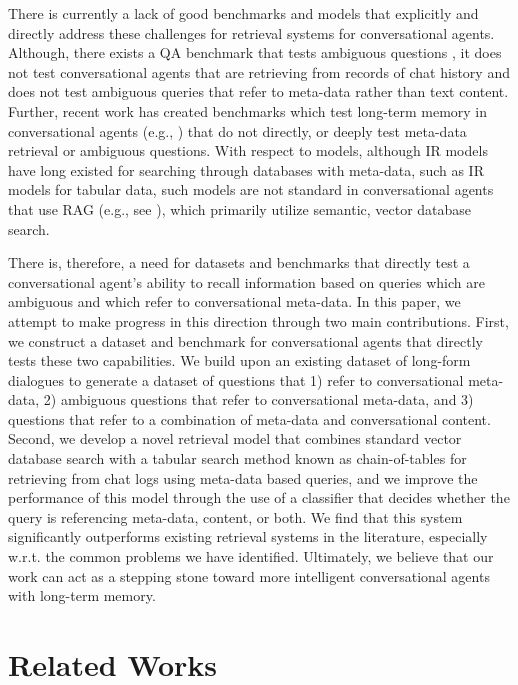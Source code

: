 \documentclass{article}
\begin{document}
There is currently a lack of good benchmarks and models that explicitly and directly address these challenges for retrieval systems for conversational agents. Although, there exists a QA benchmark that tests ambiguous questions \cite{dalton2020trec, dalton2021cast}, it does not test conversational agents that are retrieving from records of chat history and does not test ambiguous queries that refer to meta-data rather than text content. Further, recent work has created benchmarks which test long-term memory in conversational agents (e.g., \cite{jang2023conversation, maharana2024evaluating, goodai_benchmark2023}) that do not directly, or deeply test meta-data retrieval or ambiguous questions. With respect to models, although IR models have long existed for searching through databases with meta-data, such as IR models for tabular data, such models are not standard in conversational agents that use RAG (e.g., see \cite{jang2023conversation, maharana2024evaluating, zhong2024memorybank, lee2023prompted,goodai_benchmark2023, lu2023memochat}), which primarily utilize semantic, vector database search.

There is, therefore, a need for datasets and benchmarks that directly test a conversational agent's ability to recall information based on queries which are ambiguous and which refer to conversational meta-data. In this paper, we attempt to make progress in this direction through two main contributions. First, we construct a dataset and benchmark for conversational agents that directly tests these two capabilities. We build upon an existing dataset of long-form dialogues to generate a dataset of questions that 1) refer to conversational meta-data, 2) ambiguous questions that refer to conversational meta-data, and 3) questions that refer to a combination of meta-data and conversational content. Second, we develop a novel retrieval model that combines standard vector database search with a tabular search method known as chain-of-tables \cite{wang2024chain} for retrieving from chat logs using meta-data based queries, and we improve the performance of this model through the use of a classifier that decides whether the query is referencing meta-data, content, or both. We find that this system significantly outperforms existing retrieval systems in the literature, especially w.r.t. the common problems we have identified. Ultimately, we believe that our work can act as a stepping stone toward more intelligent conversational agents with long-term memory.


\section{Related Works}\label{sec:rel_work}
\end{document}
